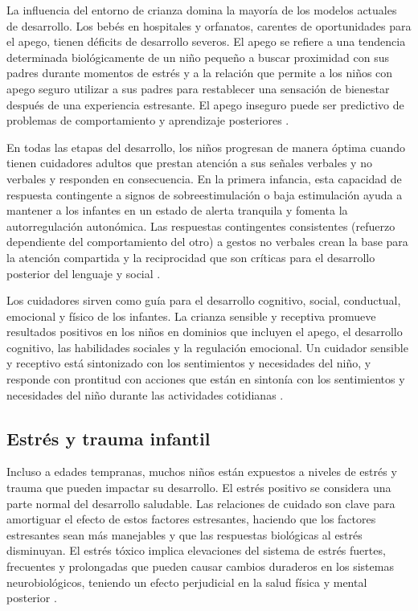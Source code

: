 La influencia del entorno de crianza domina la mayoría de los modelos actuales
de desarrollo. Los bebés en hospitales y orfanatos, carentes de oportunidades
para el apego, tienen déficits de desarrollo severos. El apego se refiere a una
tendencia determinada biológicamente de un niño pequeño a buscar proximidad con
sus padres durante momentos de estrés y a la relación que permite a los niños
con apego seguro utilizar a sus padres para restablecer una sensación de
bienestar después de una experiencia estresante. El apego inseguro puede ser
predictivo de problemas de comportamiento y aprendizaje posteriores
\cite{Nelson19}.

En todas las etapas del desarrollo, los niños progresan de manera óptima cuando
tienen cuidadores adultos que prestan atención a sus señales verbales y no
verbales y responden en consecuencia. En la primera infancia, esta capacidad de
respuesta contingente a signos de sobreestimulación o baja estimulación ayuda a
mantener a los infantes en un estado de alerta tranquila y fomenta la
autorregulación autonómica. Las respuestas contingentes consistentes (refuerzo
dependiente del comportamiento del otro) a gestos no verbales crean la base para
la atención compartida y la reciprocidad que son críticas para el desarrollo
posterior del lenguaje y social \cite{Nelson19}.

Los cuidadores sirven como guía para el desarrollo cognitivo, social,
conductual, emocional y físico de los infantes. La crianza sensible y receptiva
promueve resultados positivos en los niños en dominios que incluyen el apego,
el desarrollo cognitivo, las habilidades sociales y la regulación emocional.
Un cuidador sensible y receptivo está sintonizado con los sentimientos y
necesidades del niño, y responde con prontitud con acciones que están en
sintonía con los sentimientos y necesidades del niño durante las actividades
cotidianas \cite{Feldman3}.

\subsection{Estrés y trauma infantil}
Incluso a edades tempranas, muchos niños están expuestos a niveles de estrés y
trauma que pueden impactar su desarrollo. El estrés positivo se considera una
parte normal del desarrollo saludable. Las relaciones de cuidado son clave para
amortiguar el efecto de estos factores estresantes, haciendo que los factores
estresantes sean más manejables y que las respuestas biológicas al estrés
disminuyan. El estrés tóxico implica elevaciones del sistema de estrés fuertes,
frecuentes y prolongadas que pueden causar cambios duraderos en los sistemas
neurobiológicos, teniendo un efecto perjudicial en la salud física y mental
posterior \cite{Feldman3}.

